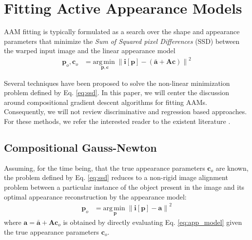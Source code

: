 \section{Fitting Active Appearance Models}
\label{sec:fit}
AAM fitting is typically formulated as a search over the shape and appearance parameters that minimize the \emph{Sum of Squared pixel Differences} (SSD) between the warped input image and the linear appearance model
\begin{align}
\mathbf{p}_o, \mathbf{c}_o & = \underset{\mathbf{p}, \mathbf{c}}{\mathrm{arg\,min\;}} 
\left\| \mathbf{i}[\mathbf{p}] - \left( \bar{\mathbf{a}} + \mathbf{A} \mathbf{c} \right) \right\|^2 
\label{eq:ssd}
\end{align}

Several techniques have been proposed to solve the non-linear minimization problem defined by Eq. \ref{eq:ssd}. In this paper, we will center the discussion around compositional gradient descent algorithms \cite{Matthews2004, Gross2005, Papandreou2008, Amberg2009, Tzimiropoulos2012, Tzimiropoulos2013} for fitting AAMs. Consequently, we will not review discriminative and regression based approaches. For these methods, we refer the interested reader to the existent literature \cite{Cootes2001, Hou2001, Batur2005, Donner2006, Liu2009, Saragih2009, Sauer2011, Xiong2013}.

\subsection{Compositional Gauss-Newton}
\label{sec:cgd}
Assuming, for the time being, that the true appearance parameters $\mathbf{c}_o$ are known, the problem defined by Eq. \ref{eq:ssd} reduces to a non-rigid image alignment problem \cite{Baker2004, Munoz2014} between a particular instance of the object present in the image and its optimal appearance reconstruction by the appearance model:
\begin{equation}
    \begin{aligned}
        \mathbf{p}_o & = \underset{\mathbf{p}}{\mathrm{arg\,min\;}} 
        \left\| \mathbf{i}[\mathbf{p}] - \mathbf{a} \right\|^2 
    \label{eq:ssd_shape}
    \end{aligned}
\end{equation}
where $\mathbf{a} = \bar{\mathbf{a}} + \mathbf{A} \mathbf{c}_o$ is obtained by directly evaluating Eq. \ref{eq:app_model} given the true appearance parameters $\mathbf{c}_o$.

